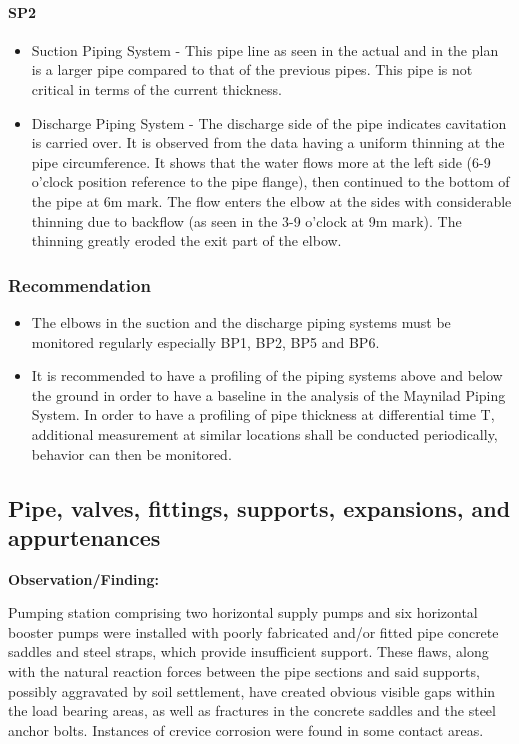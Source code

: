 \paragraph{\textbf{SP2}}
\begin{itemize}
	\item Suction Piping System - This pipe line as seen in the actual and in the plan is a larger pipe compared to that of the previous pipes. This pipe is not critical in terms of the current thickness.
	\item	Discharge Piping System - The discharge side of the pipe indicates cavitation is carried over. It is observed from the data having a uniform thinning at the pipe circumference. It shows that the water flows more at the left side (6-9 o'clock position reference to the pipe flange), then continued to the bottom of the pipe at 6m mark. The flow enters the elbow at the sides with considerable thinning due to backflow (as seen in the 3-9 o'clock at 9m mark). The thinning greatly eroded the exit part of the elbow.
\end{itemize}


\subsubsection{Recommendation}
\begin{itemize}
	\item The elbows in the suction and the discharge piping systems must be monitored regularly especially BP1, BP2, BP5 and BP6.
	\item	It is recommended to have a profiling of the piping systems above and below the ground in order to have a baseline in the analysis of the Maynilad Piping System. In order to have a profiling of pipe thickness at differential time T, additional measurement at similar locations shall be conducted periodically, behavior can then be monitored.
\end{itemize}

\subsection{Pipe, valves, fittings, supports, expansions, and appurtenances} \label{ch05mech02}

\textbf{Observation/Finding:}

Pumping station comprising two horizontal supply pumps and six horizontal booster pumps were installed with poorly fabricated and/or fitted pipe concrete saddles and steel straps, which provide insufficient support. These flaws, along with the natural reaction forces between the pipe sections and said supports, possibly aggravated by soil settlement, have created obvious visible gaps within the load bearing areas, as well as fractures in the concrete saddles and the steel anchor bolts. Instances of crevice corrosion were found in some contact areas. 


